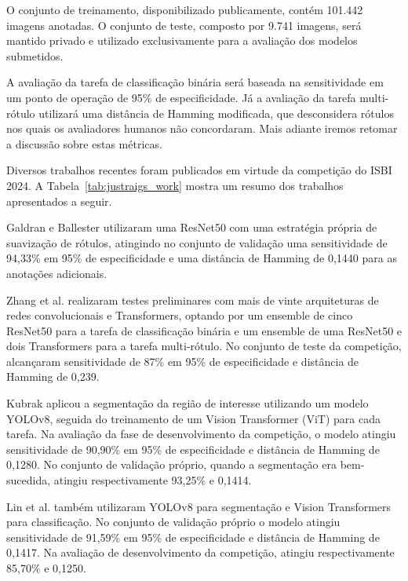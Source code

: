 \documentclass[12pt]{article}
\begin{document}
O conjunto de treinamento, disponibilizado publicamente, contém 101.442 imagens anotadas. O conjunto de teste, composto por 9.741 imagens, será mantido privado e utilizado exclusivamente para a avaliação dos modelos submetidos.

A avaliação da tarefa de classificação binária será baseada na sensitividade em um ponto de operação de 95\% de especificidade. Já a avaliação da tarefa multi-rótulo utilizará uma distância de Hamming modificada, que desconsidera rótulos nos quais os avaliadores humanos não concordaram. Mais adiante iremos retomar a discussão sobre estas métricas.

Diversos trabalhos recentes foram publicados em virtude da competição do ISBI 2024. A Tabela~\ref{tab:justraigs_work} mostra um resumo dos trabalhos apresentados a seguir.

Galdran e Ballester \cite{justraigs_galdran} utilizaram uma ResNet50 com uma estratégia própria de suavização de rótulos, atingindo no conjunto de validação uma sensitividade de 94,33\% em 95\% de especificidade e uma distância de Hamming de 0,1440 para as anotações adicionais.

Zhang et al. \cite{justraigs_zhang} realizaram testes preliminares com mais de vinte arquiteturas de redes convolucionais e Transformers, optando por um ensemble de cinco ResNet50 para a tarefa de classificação binária e um ensemble de uma ResNet50 e dois Transformers para a tarefa multi-rótulo. No conjunto de teste da competição, alcançaram sensitividade de 87\% em 95\% de especificidade e distância de Hamming de 0,239.

Kubrak \cite{justraigs_kubrak} aplicou a segmentação da região de interesse utilizando um modelo YOLOv8, seguida do treinamento de um Vision Transformer (ViT) para cada tarefa. Na avaliação da fase de desenvolvimento da competição, o modelo atingiu sensitividade de 90,90\% em 95\% de especificidade e distância de Hamming de 0,1280. No conjunto de validação próprio, quando a segmentação era bem-sucedida, atingiu respectivamente 93,25\% e 0,1414.

Lin et al. \cite{justraigs_hu_lin} também utilizaram YOLOv8 para segmentação e Vision Transformers para classificação. No conjunto de validação próprio o modelo atingiu sensitividade de 91,59\% em 95\% de especificidade e distância de Hamming de 0,1417. Na avaliação de desenvolvimento da competição, atingiu respectivamente 85,70\% e 0,1250.


\end{document}
